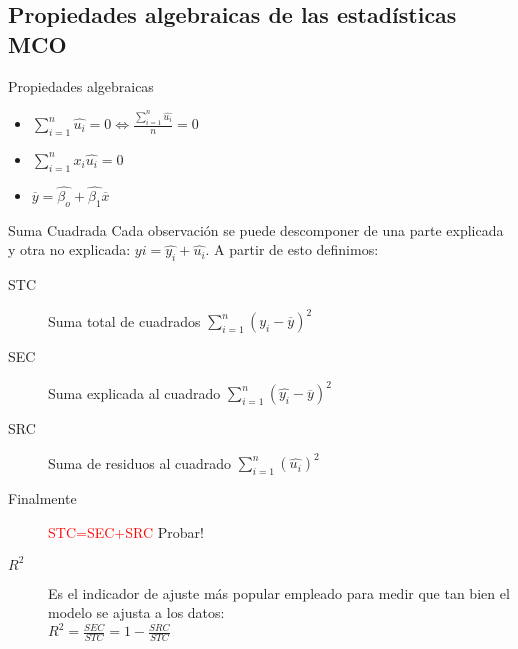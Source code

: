 \subsection{Propiedades algebraicas de las estadísticas MCO}
\begin{frame}{Propiedades algebraicas}
	\begin{itemize}
		\item $\sum_{i=1}^{n}\hat{u_{i}}=0 \Leftrightarrow \frac{\sum_{i=1}^{n}\hat{u_{i}}}{n}=0$
		\item $\sum_{i=1}^{n}x_{i}\hat{u_{i}}=0$
		\item $\overline{y}=\hat{\beta_{o}}+\hat{\beta_{1}}\overline{x}$
	\end{itemize}
\end{frame}
\begin{frame}{Suma Cuadrada}
	Cada observación se puede descomponer de una parte explicada y otra no explicada: $y{i}=\hat{y_{i}}+\hat{u_{i}}$. A partir de esto definimos:
	\begin{description}
		\item[STC] Suma total de cuadrados $\sum_{i=1}^{n}(y_{i}-\overline{y})^{2}$
		\item[SEC] Suma explicada al cuadrado $\sum_{i=1}^{n}(\hat{y_{i}}-\overline{y})^{2}$
		\item[SRC] Suma de residuos al cuadrado $\sum_{i=1}^{n}(\hat{u_{i}})^{2}$
		\item[Finalmente] \textcolor{red}{STC=SEC+SRC} Probar!
		\item[$R^{2}$] Es el indicador de ajuste más popular empleado para medir que tan bien el modelo se ajusta a los datos:\\
		$R^{2}=\frac{SEC}{STC}=1-\frac{SRC}{STC}$
	\end{description}
\end{frame}